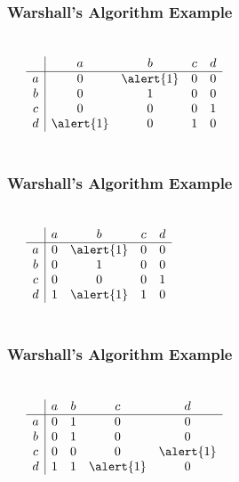\documentclass[dvipsnames]{beamer}
\begin{document}
\begin{frame}
  \frametitle{Warshall's Algorithm Example}

  \begin{columns}
    \begin{center}
    \end{center}

    \[
      \begin{array}{c|cccc}
            & a & b & c & d\\\hline
          a & 0 & \alert{1} & 0 & 0\\
          b & 0 & 1 & 0 & 0\\
          c & 0 & 0 & 0 & 1\\
          d & \alert{1} & 0 & 1 & 0
      \end{array}
    \]
  \end{columns}
\end{frame}

\begin{frame}
  \frametitle{Warshall's Algorithm Example}

  \begin{columns}
    \begin{center}
    \end{center}

    \[
      \begin{array}{c|cccc}
            & a & b & c & d\\\hline
          a & 0 & \alert{1} & 0 & 0\\
          b & 0 & 1 & 0 & 0\\
          c & 0 & 0 & 0 & 1\\
          d & 1 & \alert{1} & 1 & 0
      \end{array}
    \]
  \end{columns}
\end{frame}

\begin{frame}
  \frametitle{Warshall's Algorithm Example}

  \begin{columns}
    \begin{center}
    \end{center}

    \[
      \begin{array}{c|cccc}
            & a & b & c & d\\\hline
          a & 0 & 1 & 0 & 0\\
          b & 0 & 1 & 0 & 0\\
          c & 0 & 0 & 0 & \alert{1}\\
          d & 1 & 1 & \alert{1} & 0
      \end{array}
    \]
  \end{columns}
\end{frame}
\end{document}
